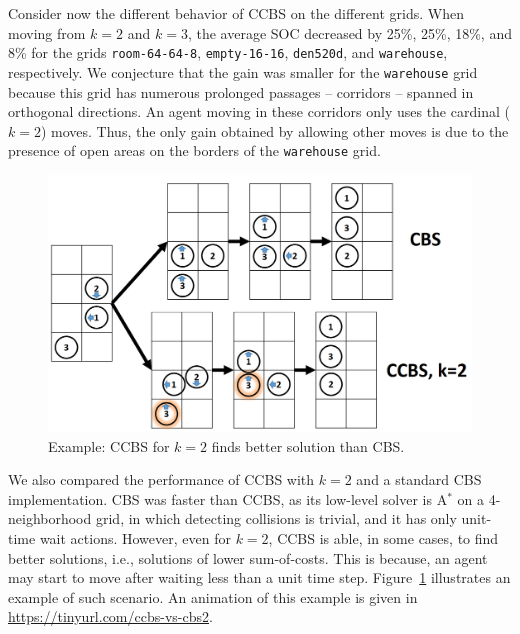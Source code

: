 \documentclass[review]{elsarticle}
\newcommand\konstantin[1]{\nb{\textbf{Konstantin:}}{red}{#1}}
\newcommand\roni[1]{\nb{\textbf{Roni:}}{green}{#1}}
\newcommand{\ccbs}{\ac{CCBS}\xspace}
\newcommand{\cbs}{\ac{CBS}\xspace}
\newcommand{\astar}{A$^*$\xspace}
\begin{document}
Consider now the different behavior of \ccbs on the different grids. 
When moving from $k=2$ and $k=3$, 
the average SOC decreased by 25\%, 25\%, 18\%, and 8\% for the grids \texttt{room-64-64-8}, \texttt{empty-16-16}, \texttt{den520d}, and \texttt{warehouse}, respectively. 
We conjecture that the gain was smaller for the \texttt{warehouse} grid because this grid has numerous prolonged passages -- corridors -- spanned in orthogonal directions. An agent moving in these corridors only uses the cardinal ($k=2$) moves. Thus, the only gain obtained by allowing other moves is due to the presence of open areas on the borders of the \texttt{warehouse} grid. 




\begin{figure}
    \centering
    \includegraphics[width=0.7\columnwidth]{anton-example.PNG}
    \caption{Example: \ccbs for $k=2$ finds better solution than \cbs.}
    \label{fig:anton-example}
\end{figure}

We also compared the performance of \ccbs with $k=2$ and a standard \cbs implementation. 
\cbs was faster than \ccbs, as its low-level solver is \astar on a 4-neighborhood grid, in which detecting collisions is trivial, and it has only unit-time wait actions. However, even for $k=2$, \ccbs is able, in some cases, to find better solutions, i.e., solutions of lower sum-of-costs. This is because, an agent may start to move after waiting less than a unit time step. 
Figure~\ref{fig:anton-example} illustrates an example of such scenario. An animation of this example is given in \url{https://tinyurl.com/ccbs-vs-cbs2}. %
\end{document}
